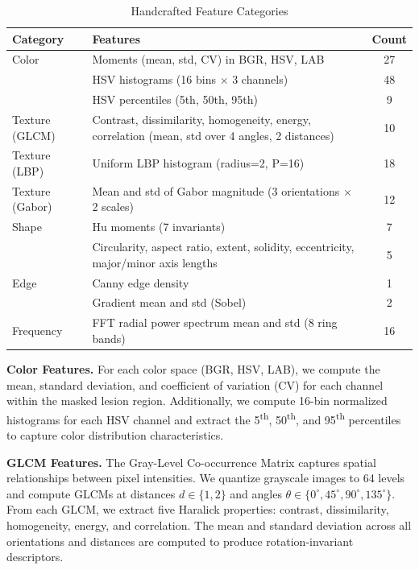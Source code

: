 \documentclass[conference]{IEEEtran}
\begin{document}
\begin{table}[htbp]
\caption{Handcrafted Feature Categories}
\label{tab:handcrafted}
\centering
\small
\begin{tabular}{@{}p{1.7cm}p{5.2cm}c@{}}
\toprule
\textbf{Category} & \textbf{Features} & \textbf{Count} \\
\midrule
Color & Moments (mean, std, CV) in BGR, HSV, LAB & 27 \\
      & HSV histograms (16 bins $\times$ 3 channels) & 48 \\
      & HSV percentiles (5th, 50th, 95th) & 9 \\
\midrule
Texture (GLCM) & Contrast, dissimilarity, homogeneity, energy, correlation (mean, std over 4 angles, 2 distances) & 10 \\
\midrule
Texture (LBP)  & Uniform LBP histogram (radius=2, P=16) & 18 \\
\midrule
Texture (Gabor)& Mean and std of Gabor magnitude (3 orientations $\times$ 2 scales) & 12 \\
\midrule
Shape & Hu moments (7 invariants) & 7 \\
      & Circularity, aspect ratio, extent, solidity, eccentricity, major/minor axis lengths & 5 \\
\midrule
Edge & Canny edge density & 1 \\
     & Gradient mean and std (Sobel) & 2 \\
\midrule
Frequency & FFT radial power spectrum mean and std (8 ring bands) & 16 \\
\bottomrule
\end{tabular}
\end{table}

\textbf{Color Features.} For each color space (BGR, HSV, LAB), we
compute the mean, standard deviation, and coefficient of variation
(CV) for each channel within the masked lesion region. Additionally,
we compute 16-bin normalized histograms for each HSV channel and
extract the 5\textsuperscript{th}, 50\textsuperscript{th}, and
95\textsuperscript{th} percentiles to capture color distribution
characteristics.

\textbf{GLCM Features.} The Gray-Level Co-occurrence Matrix captures
spatial relationships between pixel intensities. We quantize
grayscale images to 64 levels and compute GLCMs at distances $d \in
\{1, 2\}$ and angles $\theta \in \{0^\circ, 45^\circ, 90^\circ,
135^\circ\}$. From each GLCM, we extract five Haralick properties:
contrast, dissimilarity, homogeneity, energy, and correlation. The
mean and standard deviation across all orientations and distances
are computed to produce rotation-invariant descriptors.
\end{document}
